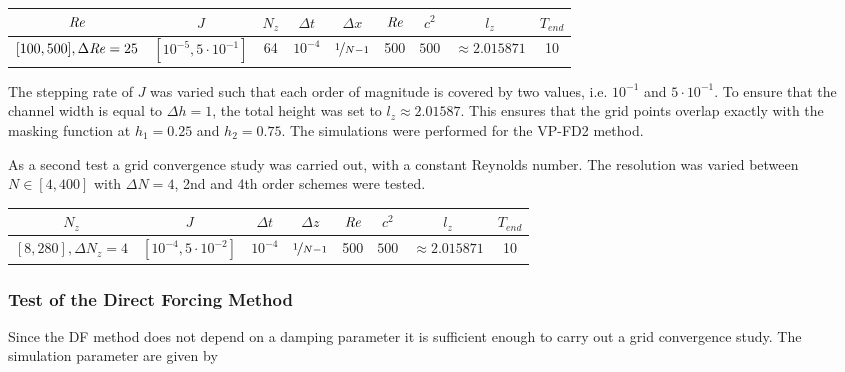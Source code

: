 \begin{center}
\vspace*{0.7ex}
\begin{tabular}{c|c|c|c|c|c|c|c|c }
 $ \mbox{\textit{Re}}  $                      & $J$ & $N_z$ &  $\Delta t$ & $\Delta x$            & $\mbox{\textit{Re}}$  & $c^2$   & $l_z$ & $T_{end}$\\
\hline
 $[100, 500], \Delta \mbox{\textit{Re}} = 25 $& $[10^{-5}, 5\cdot10^{-1}]  $ & 64 &  $10^{-4}$ & $\nicefrac{1}{N - 1}$ & 500     & $500$   & $\approx{2.015871}$ & 10\\
\end{tabular}
\vspace*{0.7ex}
\end{center}

The stepping rate of $J$ was varied such that each order of magnitude is covered by two values, i.e. $10^{-1}$ and $5\cdot10^{-1}$.
To ensure that the channel width is equal to $\Delta h = 1$, the total height was set to $l_z\approx2.01587$.
This ensures that the grid points overlap exactly with the masking function at $h_1=0.25$ and $h_2=0.75$.
The simulations were performed for the VP-FD2 method.

As a second test a grid convergence study was carried out, with a constant Reynolds number.
The resolution was varied between $N\in [4, 400]$ with $\Delta N = 4$, 2nd and 4th order schemes were tested.

\begin{center}
\vspace*{0.7ex}
\begin{tabular}{c|c|c|c|c|c|c|c }
 $ N_z  $                      & $J$ &  $\Delta t$ & $\Delta z$            & $\mbox{\textit{Re}}$  & $c^2$   & $l_z$ & $T_{end}$\\
\hline
 $[8, 280], \Delta N_z = 4 $& $[10^{-4}, 5\cdot10^{-2}]  $ &  $10^{-4}$ & $\nicefrac{1}{N - 1}$ & 500     & $500$   & $\approx{2.015871}$  & 10\\
\end{tabular}
\vspace*{0.7ex}
\end{center}

\subsubsection{Test of the Direct Forcing Method}

Since the DF method does not depend on a damping parameter it is sufficient enough
to carry out a grid convergence study.  The simulation parameter are given by

